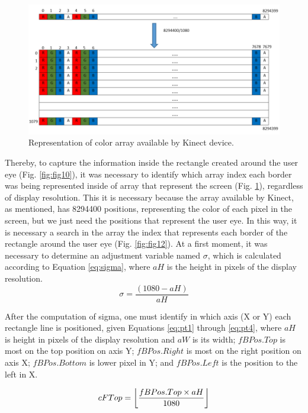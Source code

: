 \documentclass[10pt, conference]{IEEEtran}
\DeclarePairedDelimiter\floor{\lfloor}{\rfloor}
\begin{document}
  \begin{figure}[t]
      \centering
      \includegraphics{figures/pic11.png}
      \caption{Representation of color array available by Kinect device.}
      \label{fig:fig11}
  \end{figure}

	Thereby, to capture the information inside the rectangle created around the user eye (Fig. \ref{fig:fig10}), it was necessary to identify which array index each border was being represented inside of array that represent the screen (Fig. \ref{fig:fig11}), regardless of display resolution. 
	This it is necessary because the array available by Kinect, as mentioned, has 8294400 positions, representing the color of each pixel in the screen, but we just need the positions that represent the user eye. 
	In this way, it is necessary a search in the array the index that represents each border of the rectangle around the user eye (Fig. \ref{fig:fig12}). 
	At a first moment, it was necessary to determine an adjustment variable named $\sigma$, which is calculated according to Equation \ref{eq:sigma}, where $aH$ is the height in pixels of the display resolution.
    \begin{equation}
    	\sigma = \frac{(1080 - aH)}{aH}
		\label{eq:sigma}
	\end{equation}
    
	After the computation of sigma, one must identify in which axis (X or Y) each rectangle line is positioned, given Equations \ref{eq:pt1} through \ref{eq:pt4}, where $aH$ is height in pixels of the display resolution and $aW$ is its width; $fBPos.Top$ is most on the top position on axis Y; $fBPos.Right$ is most on the right position on axis X; $fBPos.Bottom$ is lower pixel in Y; and $fBPos.Left$ is the position to the left in X.
    
	\begin{equation}
		cFTop = \floor*{\frac{fBPos.Top \times aH}{1080}}
        \label{eq:pt1}
	\end{equation}
    
\end{document}
